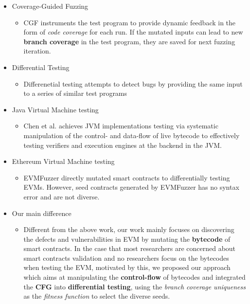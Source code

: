 \documentclass[a4paper]{article}
\begin{document}
	\begin{itemize}
		\item Coverage-Guided Fuzzing
		\begin{itemize}
			\item CGF instruments the test program to provide dynamic feedback in the form of \textit{code coverage} for each run. If the mutated inputs can lead to new \textbf{branch coverage} in the test program, they are saved for next fuzzing iteration.
		\end{itemize} 
		\item Differential Testing
		\begin{itemize} 
			\item Differenetial testing attempts to detect bugs by providing the same input to a series of similar test programs
		\end{itemize}
		\item Java Virtual Machine testing
		\begin{itemize}
			\item Chen et al. 
			achieves JVM implementations testing via systematic manipulation of the control-
			and data-flow of live bytecode to effectively testing verifiers and execution engines at the backend in the JVM.
		\end{itemize}
		\item Ethereum Virtual Machine testing
		\begin{itemize}
			\item EVMFuzzer directly mutated smart contracts to differentially testing EVMs. However, seed contracts generated by EVMFuzzer has no syntax error and are not diverse.
		\end{itemize}
		\item Our main difference
		\begin{itemize}
			\item Different from the above work, our work
			mainly focuses on discovering the defects and vulnerabilities in
			EVM by mutating the \textbf{bytecode} of smart contracts. In the case that most researchers are concerned about smart
			contracts validation and no researchers focus on the bytecodes when testing the EVM, motivated by this, we proposed our approach which aims at manipulating the \textbf{control-flow} of bytecodes and integrated the \textbf{CFG} into \textbf{differential testing}, using the \textit{branch coverage uniqueness} as the \textit{fitness function} to select the diverse seeds.
		\end{itemize}
	\end{itemize}
\end{document}
